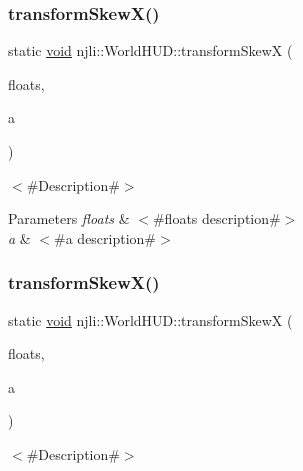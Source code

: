 \subsubsection{\texorpdfstring{transform\+Skew\+X()}{transformSkewX()}\hspace{0.1cm}{\footnotesize\ttfamily [1/2]}}
{\footnotesize\ttfamily static \mbox{\hyperlink{_thread_8h_af1e856da2e658414cb2456cb6f7ebc66}{void}} njli\+::\+World\+H\+U\+D\+::transform\+SkewX (\begin{DoxyParamCaption}\item[{bt\+Matrix3x3 \&}]{floats,  }\item[{\mbox{\hyperlink{_util_8h_a5f6906312a689f27d70e9d086649d3fd}{f32}}}]{a }\end{DoxyParamCaption})\hspace{0.3cm}{\ttfamily [static]}}

$<$\#\+Description\#$>$


\begin{DoxyParams}{Parameters}
{\em floats} & $<$\#floats description\#$>$ \\
\hline
{\em a} & $<$\#a description\#$>$ \\
\hline
\end{DoxyParams}
\mbox{\label{classnjli_1_1_world_h_u_d_ab8f44613e057b3fd9cbcdd157e1b5c8b}} 
\subsubsection{\texorpdfstring{transform\+Skew\+X()}{transformSkewX()}\hspace{0.1cm}{\footnotesize\ttfamily [2/2]}}
{\footnotesize\ttfamily static \mbox{\hyperlink{_thread_8h_af1e856da2e658414cb2456cb6f7ebc66}{void}} njli\+::\+World\+H\+U\+D\+::transform\+SkewX (\begin{DoxyParamCaption}\item[{\mbox{\hyperlink{_util_8h_a5f6906312a689f27d70e9d086649d3fd}{f32}} $\ast$}]{floats,  }\item[{\mbox{\hyperlink{_util_8h_a5f6906312a689f27d70e9d086649d3fd}{f32}}}]{a }\end{DoxyParamCaption})\hspace{0.3cm}{\ttfamily [static]}}

$<$\#\+Description\#$>$


